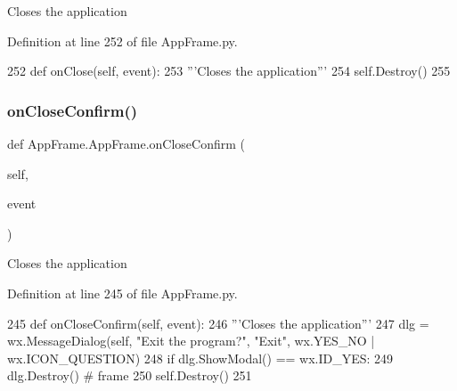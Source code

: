 \begin{DoxyVerb}Closes the application\end{DoxyVerb}
 

Definition at line 252 of file App\+Frame.\+py.


\begin{DoxyCode}
252     \textcolor{keyword}{def }onClose(self, event):
253         \textcolor{stringliteral}{'''Closes the application'''}
254         self.Destroy()
255 
\end{DoxyCode}
\mbox{\label{classAppFrame_1_1AppFrame_a65bdce54a07b810b589c6c0096c0c78d}} 
\subsubsection{\texorpdfstring{on\+Close\+Confirm()}{onCloseConfirm()}}
{\footnotesize\ttfamily def App\+Frame.\+App\+Frame.\+on\+Close\+Confirm (\begin{DoxyParamCaption}\item[{}]{self,  }\item[{}]{event }\end{DoxyParamCaption})}

\begin{DoxyVerb}Closes the application\end{DoxyVerb}
 

Definition at line 245 of file App\+Frame.\+py.


\begin{DoxyCode}
245     \textcolor{keyword}{def }onCloseConfirm(self, event):
246         \textcolor{stringliteral}{'''Closes the application'''}
247         dlg = wx.MessageDialog(self, \textcolor{stringliteral}{"Exit the program?"}, \textcolor{stringliteral}{"Exit"}, wx.YES\_NO | wx.ICON\_QUESTION)
248         \textcolor{keywordflow}{if} dlg.ShowModal() == wx.ID\_YES:
249             dlg.Destroy()  \textcolor{comment}{# frame}
250         self.Destroy()
251 
\end{DoxyCode}
\mbox{\label{classAppFrame_1_1AppFrame_a7e972158ea6bfcb0ede937b37079b4c7}} 
